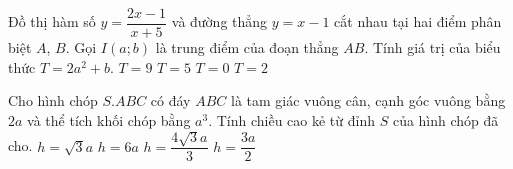 \begin{ex}%
	Đồ thị hàm số $y=\dfrac{2x-1}{x+5}$ và đường thẳng $y=x-1$ cắt nhau tại hai điểm phân biệt $A$, $B$. Gọi $I(a;b)$ là trung điểm của đoạn thẳng $AB$. Tính giá trị của biểu thức $T=2a^2+b$.
	\choice
	{$T=9$}
	{$T=5$}
	{\True $T=0$}
	{$T=2$}	
\end{ex}

\begin{ex}%
	Cho hình chóp $S.ABC$ có đáy $ABC$ là tam giác vuông cân, cạnh góc vuông bằng $2a$ và thể tích khối chóp bằng $a^3$. Tính chiều cao kẻ từ đỉnh $S$ của hình chóp đã cho.
	\choice
	{$h=\sqrt{3}a$}
	{$h=6a$}
	{$h=\dfrac{4\sqrt{3}a}{3}$}
	{\True $h=\dfrac{3a}{2}$}
\end{ex}

